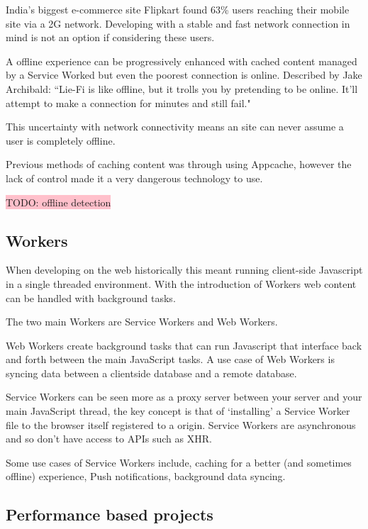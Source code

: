 India's biggest e-commerce site Flipkart found 63\% users reaching their mobile site via a 2G network. \cite{flipkart} Developing with a stable and fast network connection in mind is not an option if considering these users.

A offline experience can be progressively enhanced with cached content managed by a Service Worked but even the poorest connection is online. Described by Jake Archibald: ``Lie-Fi is like offline, but it trolls you by pretending to be online. It'll attempt to make a connection for minutes and still fail." \cite{supercharging_page_load}

This uncertainty with network connectivity means an site can never assume a user is completely offline.

Previous methods of caching content was through using Appcache, however the lack of control made it a very dangerous technology to use. %

\colorbox{pink}{TODO: offline detection}

\subsection{Workers} \label{l-r--workers}

When developing on the web historically this meant running client-side Javascript in a single threaded environment. With the introduction of Workers web content can be handled with background tasks.

The two main Workers are Service Workers and Web Workers.

Web Workers create background tasks that can run Javascript that interface back and forth between the main JavaScript tasks. A use case of Web Workers is syncing data between a clientside database and a remote database. \cite{using_web_workers}

Service Workers can be seen more as a proxy server between your server and your main JavaScript thread, the key concept is that of `installing' a Service Worker file to the browser itself registered to a origin. Service Workers are asynchronous and so don't have access to APIs such as XHR.

Some use cases of Service Workers include, caching for a better (and sometimes offline) experience, Push notifications, background data syncing. \cite{service_worker}

\subsection{Performance based projects}

